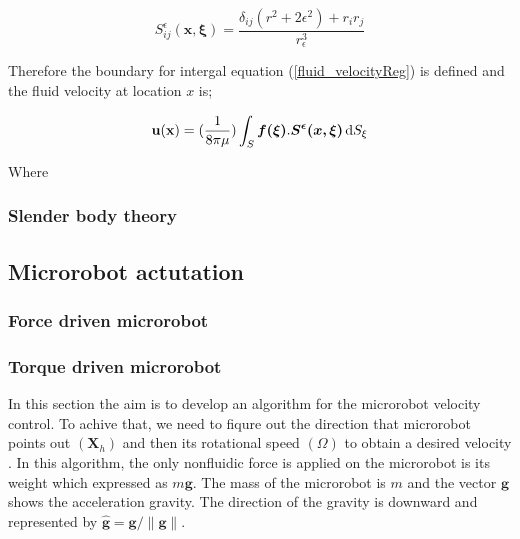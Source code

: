 \documentclass[12pt,a4paper,titlepage]{report}
\begin{document}
\begin{equation}
 S _{ij}^{\epsilon} \bm{(x , \xi)} = \frac{\delta _{ij}(r^2 + 2{\epsilon}^2) + r_i r_j}{r_{\epsilon}^3}
\label{velocity-tensor}
\end{equation}

Therefore the boundary for intergal equation (\ref{fluid_velocityReg}) is defined and the fluid velocity at location $x$ is;

\begin{equation}
\bold {u(x)} =(\frac{1}{8 \pi \mu}) \int_S \mathrm \bm{f(\xi)} . \bm{S^{\epsilon}( x, \xi)}\, \mathrm{d}S_{\xi}
\label{fluid_velocityReg}
\end{equation}

Where 





\subsubsection{Slender body theory}\label{method1}


\subsection{Microrobot actutation}\label{microActuation}



\subsubsection{Force driven microrobot}

\subsubsection{Torque driven microrobot}

In this section the aim is to develop an algorithm for the microrobot velocity control. To achive that, we need to 
fiqure out the direction that microrobot points out $(\bm{X}_{h})$ and then its rotational speed $(\Omega)$
 to obtain a desired velocity \cite{mahoney2011velocity}.
In this algorithm, the only nonfluidic force is applied on the microrobot is its weight which expressed as 
$m\bm{g}$. The mass of the microrobot is $m$ and the vector $\bm{g}$ shows the acceleration gravity. 
The direction of the gravity is downward and represented by $\hat{ \bm{g} }= \bm{g}/ \| \bm{g}\|$.




\end{document}
